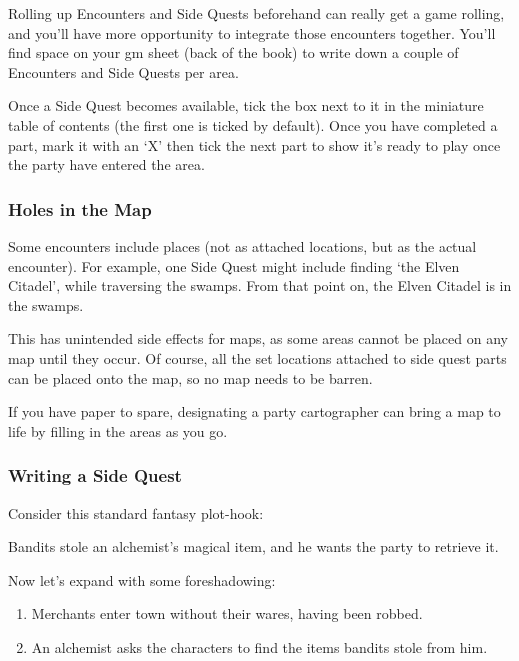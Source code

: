 \begin{multicols}{2}
Rolling up Encounters and Side Quests beforehand can really get a game rolling, and you'll have more opportunity to integrate those encounters together.
You'll find space on your \gls{gm} sheet (back of the book) to write down a couple of Encounters and Side Quests per area.

Once a Side Quest becomes available, tick the box next to it in the miniature table of contents (the first one is ticked by default).
Once you have completed a part, mark it with an `X' then tick the next part to show it's ready to play once the party have entered the area.

\subsubsection{Holes in the Map}

Some encounters include places (not as attached locations, but as the actual encounter).
For example, one Side Quest might include finding `the Elven Citadel', while traversing the swamps.
From that point on, the Elven Citadel is in the swamps.

This has unintended side effects for maps, as some areas cannot be placed on any map until they occur.
Of course, all the set locations attached to side quest parts can be placed onto the map, so no map needs to be barren.

If you have paper to spare, designating a party cartographer can bring a map to life by filling in the areas as you go.

\subsubsection{Writing a Side Quest}

Consider this standard fantasy plot-hook:

\begin{exampletext}

  Bandits stole an alchemist's magical item, and he wants the party to retrieve it.

\end{exampletext}

Now let's expand with some foreshadowing:

\begin{enumerate}
  \item
  Merchants enter town without their wares, having been robbed.
  \item
  An alchemist asks the characters to find the items bandits stole from him.
\end{enumerate}


\end{multicols}
